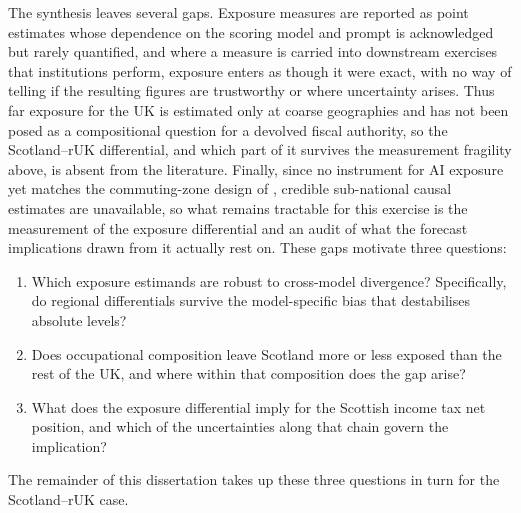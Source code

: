 The synthesis leaves several gaps. Exposure measures are reported as point estimates whose dependence on the scoring model and prompt is acknowledged but rarely quantified, and where a measure is carried into downstream exercises that institutions perform, exposure enters as though it were exact, with no way of telling if the resulting figures are trustworthy or where uncertainty arises. Thus far exposure for the UK is estimated only at coarse geographies and has not been posed as a compositional question for a devolved fiscal authority, so the Scotland--rUK differential, and which part of it survives the measurement fragility above, is absent from the literature. Finally, since no instrument for AI exposure yet matches the commuting-zone design of \citet{acemoglu2020}, credible sub-national causal estimates are unavailable, so what remains tractable for this exercise is the measurement of the exposure differential and an audit of what the forecast implications drawn from it actually rest on. These gaps motivate three questions:

\begin{enumerate}
\item Which exposure estimands are robust to cross-model divergence? Specifically, do regional differentials survive the model-specific bias that destabilises absolute levels?
\item Does occupational composition leave Scotland more or less exposed than the rest of the UK, and where within that composition does the gap arise?
\item What does the exposure differential imply for the Scottish income tax net position, and which of the uncertainties along that chain govern the implication?
\end{enumerate}

The remainder of this dissertation takes up these three questions in turn for the Scotland--rUK case.